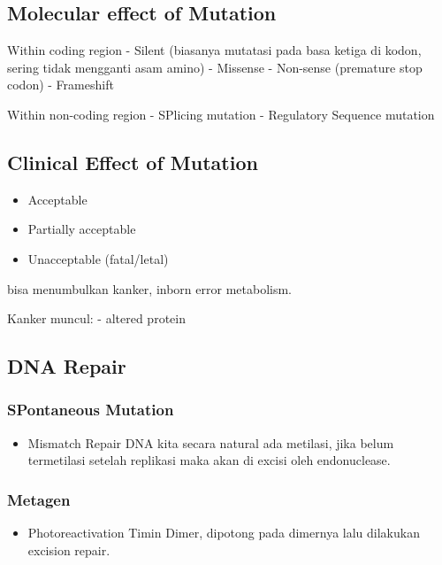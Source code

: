 \documentclass[
  letterpaper,
  DIV=11,
  numbers=noendperiod]{scrreprt}
\providecommand{\tightlist}{%
  \setlength{\itemsep}{0pt}\setlength{\parskip}{0pt}}\usepackage{longtable,booktabs,array}
\begin{document}
\subsection{Molecular effect of
Mutation}\label{molecular-effect-of-mutation}

Within coding region - Silent (biasanya mutatasi pada basa ketiga di
kodon, sering tidak mengganti asam amino) - Missense - Non-sense
(premature stop codon) - Frameshift

Within non-coding region - SPlicing mutation - Regulatory Sequence
mutation

\subsection{Clinical Effect of
Mutation}\label{clinical-effect-of-mutation}

\begin{itemize}
\tightlist
\item
  Acceptable
\item
  Partially acceptable
\item
  Unacceptable (fatal/letal)
\end{itemize}

bisa menumbulkan kanker, inborn error metabolism.

Kanker muncul: - altered protein

\subsection{DNA Repair}\label{dna-repair}

\subsubsection{SPontaneous Mutation}\label{spontaneous-mutation}

\begin{itemize}
\tightlist
\item
  Mismatch Repair DNA kita secara natural ada metilasi, jika belum
  termetilasi setelah replikasi maka akan di excisi oleh endonuclease.
\end{itemize}

\subsubsection{Metagen}\label{metagen}

\begin{itemize}
\tightlist
\item
  Photoreactivation Timin Dimer, dipotong pada dimernya lalu dilakukan
  excision repair.
\end{itemize}
\end{document}
